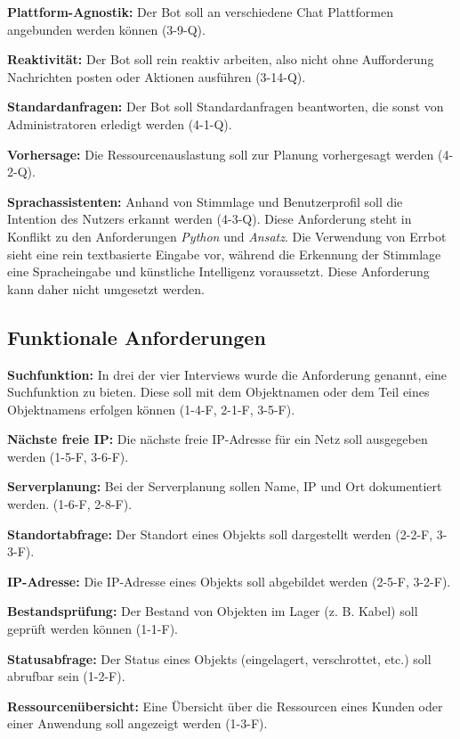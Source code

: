\textbf{Plattform-Agnostik:} Der Bot soll an verschiedene Chat Plattformen angebunden werden können (3-9-Q).

\textbf{Reaktivität:} Der Bot soll rein reaktiv arbeiten, also nicht ohne Aufforderung Nachrichten posten oder Aktionen ausführen (3-14-Q).

\textbf{Standardanfragen:} Der Bot soll Standardanfragen beantworten, die sonst von Administratoren erledigt werden (4-1-Q).

\textbf{Vorhersage:} Die Ressourcenauslastung soll zur Planung vorhergesagt werden (4-2-Q).

\textbf{Sprachassistenten:} Anhand von Stimmlage und Benutzerprofil soll die Intention des Nutzers erkannt werden (4-3-Q). Diese Anforderung steht in Konflikt zu den Anforderungen \textit{Python} und \textit{Ansatz}. Die Verwendung von Errbot sieht eine rein textbasierte Eingabe vor, während die Erkennung der Stimmlage eine Spracheingabe und künstliche Intelligenz voraussetzt. Diese Anforderung kann daher nicht umgesetzt werden.

\newpage
\subsection{Funktionale Anforderungen}
\textbf{Suchfunktion: } In drei der vier Interviews wurde die Anforderung genannt, eine Suchfunktion zu bieten. Diese soll mit dem Objektnamen oder dem Teil eines Objektnamens erfolgen können (1-4-F, 2-1-F, 3-5-F).

\textbf{Nächste freie IP: } Die nächste freie IP-Adresse für ein Netz soll ausgegeben werden (1-5-F, 3-6-F). 

\textbf{Serverplanung: } Bei der Serverplanung sollen Name, IP und Ort dokumentiert werden. (1-6-F, 2-8-F).

\textbf{Standortabfrage: } Der Standort eines Objekts soll dargestellt werden (2-2-F, 3-3-F).

\textbf{IP-Adresse:} Die IP-Adresse eines Objekts soll abgebildet werden (2-5-F, 3-2-F).

\textbf{Bestandsprüfung:} Der Bestand von Objekten im Lager (z. B. Kabel) soll geprüft werden können (1-1-F).

\textbf{Statusabfrage:} Der Status eines Objekts (eingelagert, verschrottet, etc.) soll abrufbar sein (1-2-F).

\textbf{Ressourcenübersicht:} Eine Übersicht über die Ressourcen eines Kunden oder einer Anwendung soll angezeigt werden (1-3-F).

